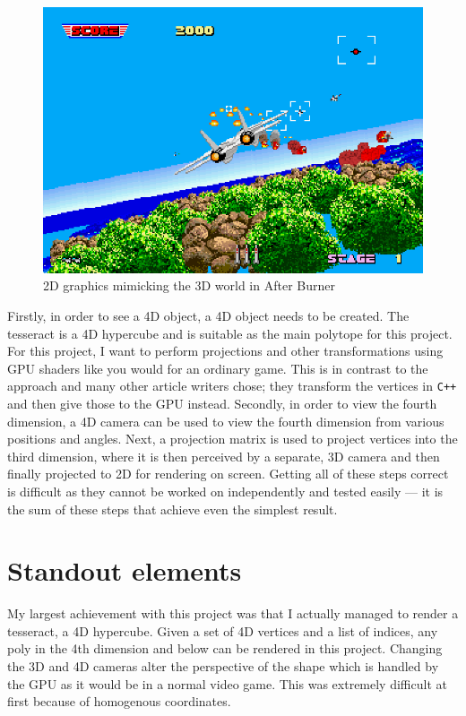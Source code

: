 \documentclass[11pt, a4paper]{article}
\begin{document}
\begin{figure}[!h]
  \centering
  \includegraphics[width=12cm]{img/after_burner.png}
  \caption{2D graphics mimicking the 3D world in After Burner \parencite{awesome2016arcade}}
  \label{fig:afterburner}
\end{figure}

Firstly, in order to see a 4D object, a 4D object needs to be created. The tesseract is a 4D hypercube and is suitable as the main polytope for this project. For this project, I want to perform projections and other transformations using GPU shaders like you would for an ordinary game. This is in contrast to the approach \citeauthor*{hollasch1991four} \parencite*{hollasch1991four} and many other article writers chose; they transform the vertices in \texttt{C++} and then give those to the GPU instead. Secondly, in order to view the fourth dimension, a 4D camera can be used to view the fourth dimension from various positions and angles. Next, a projection matrix is used to project vertices into the third dimension, where it is then perceived by a separate, 3D camera and then finally projected to 2D for rendering on screen. Getting all of these steps correct is difficult as they cannot be worked on independently and tested easily --- it is the sum of these steps that achieve even the simplest result. 

\section{Standout elements}
\label{sec:standoutElements}

My largest achievement with this project was that I actually managed to render a tesseract, a 4D hypercube. Given a set of 4D vertices and a list of indices, any poly in the 4th dimension and below can be rendered in this project. Changing the 3D and 4D cameras alter the perspective of the shape which is handled by the GPU as it would be in a normal video game. This was extremely difficult at first because of homogenous coordinates.
\end{document}
